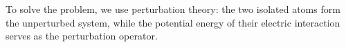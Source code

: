 To solve the problem, we use perturbation theory: the two isolated atoms form the unperturbed system, while the potential energy of their electric interaction serves as the perturbation operator.
